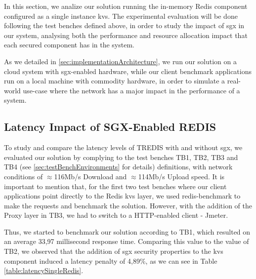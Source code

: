 In this section, we analize our solution running the in-memory Redis component configured as a single instance \gls{kvs}. The experimental evaluation will be done following the test benches defined above, in order to study the impact of \gls{sgx} in our system, analysing both the performance and resource allocation impact that each secured component has in the system.

As we detailed in \ref{sec:implementationArchitecture}, we run our solution on a cloud system with \gls{sgx}-enabled hardware, while our client benchmark applications run on a local machine with commodity hardware, in order to simulate a real-world use-case where the network has a major impact in the performance of a system.

\subsection{Latency Impact of SGX-Enabled REDIS}

To study and compare the latency levels of TREDIS with and without \gls{sgx}, we evaluated our solution by complying to the test benches TB1, TB2, TB3 and TB4 (see \ref{sec:testBenchEnvironments} for details) definitions, with network conditions of $\approx$116Mb/s Download and $\approx$114Mb/s Upload speed. It is important to mention that, for the first two test benches where our client applications point directly to the Redis \gls{kvs} layer, we used redis-benchmark to make the requests and benchmark the solution. However, with the addition of the Proxy layer in TB3, we had to switch to a HTTP-enabled client - Jmeter.

Thus, we started to benchmark our solution according to TB1, which resulted on an average 33,97 millisecond response time.
Comparing this value to the value of TB2, we observed that the addition of \gls{sgx} security properties to the \gls{kvs} component induced a latency penalty of 4,89\%, as we can see in Table \ref{table:latencySingleRedis}.


